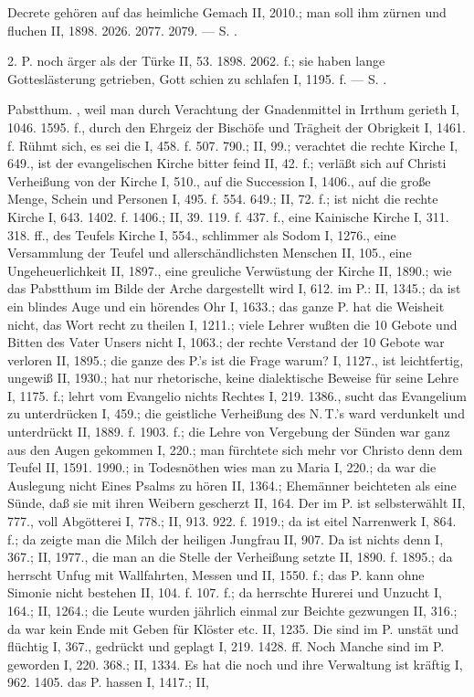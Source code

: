 Decrete gehören auf das heimliche Gemach II, 2010.; man soll ihm zürnen und fluchen II, 1898. 2026. 2077. 2079. — S. .

2.  P. noch ärger als der Türke II, 53. 1898. 2062. f.; sie haben lange Gotteslästerung getrieben, Gott schien zu schlafen I, 1195. f. — S. .

Pabstthum. , weil man durch Verachtung der Gnadenmittel in Irrthum gerieth I, 1046. 1595. f., durch den Ehrgeiz der Bischöfe und Trägheit der Obrigkeit I, 1461. f. Rühmt sich, es sei die  I, 458. f. 507. 790.; II, 99.; verachtet die rechte Kirche I, 649., ist der evangelischen Kirche bitter feind II, 42. f.; verläßt sich auf Christi Verheißung von der Kirche I, 510., auf die Succession I, 1406., auf die große Menge, Schein und Personen I, 495. f. 554. 649.; II, 72. f.; ist nicht die rechte Kirche I, 643. 1402. f. 1406.; II, 39. 119. f. 437. f., eine Kainische Kirche I, 311. 318. ff., des Teufels Kirche I, 554., schlimmer als Sodom I, 1276., eine Versammlung der Teufel und allerschändlichsten Menschen II, 105., eine Ungeheuerlichkeit II, 1897., eine greuliche Verwüstung der Kirche II, 1890.; wie das Pabstthum im Bilde der Arche dargestellt wird I, 612.  im P.: II, 1345.; da ist ein blindes Auge und ein hörendes Ohr I, 1633.; das ganze P. hat die Weisheit nicht, das Wort recht zu theilen I, 1211.; viele Lehrer wußten die 10 Gebote und Bitten des Vater Unsers nicht I, 1063.; der rechte Verstand der 10 Gebote war verloren II, 1895.; die ganze  des P.’s ist die Frage warum? I, 1127., ist leichtfertig, ungewiß II, 1930.; hat nur rhetorische, keine dialektische Beweise für seine Lehre I, 1175. f.; lehrt vom Evangelio nichts Rechtes I, 219. 1386., sucht das Evangelium zu unterdrücken I, 459.; die geistliche Verheißung des N.\,T.’s ward verdunkelt und unterdrückt II, 1889. f. 1903. f.; die Lehre von Vergebung der Sünden war ganz aus den Augen gekommen I, 220.; man fürchtete sich mehr vor Christo denn dem Teufel II, 1591. 1990.; in Todesnöthen wies man zu Maria I, 220.; da war die Auslegung nicht Eines Psalms zu hören II, 1364.; Ehemänner beichteten als eine Sünde, daß sie mit ihren Weibern gescherzt II, 164. Der  im P. ist selbsterwählt II, 777., voll Abgötterei I, 778.; II, 913. 922. f. 1919.; da ist eitel Narrenwerk I, 864. f.; da zeigte man die Milch der heiligen Jungfrau II, 907. Da ist nichts denn  I, 367.; II, 1977., die man an die Stelle der Verheißung setzte II, 1890. f. 1895.; da herrscht Unfug mit Wallfahrten, Messen und  II, 1550. f.; das P. kann ohne Simonie nicht bestehen II, 104. f. 107. f.; da herrschte Hurerei und Unzucht I, 164.; II, 1264.; die Leute wurden jährlich einmal zur Beichte gezwungen II, 316.; da war kein Ende mit Geben für Klöster etc. II, 1235. Die  sind im P. unstät und flüchtig I, 367., gedrückt und geplagt I, 219. 1428. ff. Noch Manche sind im P.  geworden I, 220. 368.; II, 1334. Es hat die  noch und ihre Verwaltung ist kräftig I, 962. 1405.  das P. hassen I, 1417.; II, 
